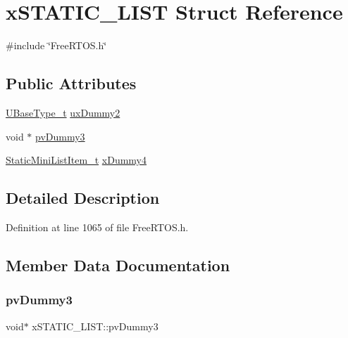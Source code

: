 \hypertarget{structxSTATIC__LIST}{}\section{x\+S\+T\+A\+T\+I\+C\+\_\+\+L\+I\+ST Struct Reference}
\label{structxSTATIC__LIST}


{\ttfamily \#include \char`\"{}Free\+R\+T\+O\+S.\+h\char`\"{}}

\subsection*{Public Attributes}
\begin{DoxyCompactItemize}
\item 
\hyperlink{pic32mx_2portmacro_8h_a646f89d4298e4f5afd522202b11cb2e6}{U\+Base\+Type\+\_\+t} \hyperlink{structxSTATIC__LIST_aa0522bc6ec8c956a9177ed9cb0e6d19f}{ux\+Dummy2}
\item 
void $\ast$ \hyperlink{structxSTATIC__LIST_aee46aef7379c7a341ec5a3e70d6dc85f}{pv\+Dummy3}
\item 
\hyperlink{FreeRTOS_8h_a9097f48f4dfa56e8e01d9179462c7994}{Static\+Mini\+List\+Item\+\_\+t} \hyperlink{structxSTATIC__LIST_aafa5f9d67d7f3636f2d1f8c372e75ecf}{x\+Dummy4}
\end{DoxyCompactItemize}


\subsection{Detailed Description}


Definition at line 1065 of file Free\+R\+T\+O\+S.\+h.



\subsection{Member Data Documentation}
\mbox{\label{structxSTATIC__LIST_aee46aef7379c7a341ec5a3e70d6dc85f}} 
\subsubsection{\texorpdfstring{pv\+Dummy3}{pvDummy3}}
{\footnotesize\ttfamily void$\ast$ x\+S\+T\+A\+T\+I\+C\+\_\+\+L\+I\+S\+T\+::pv\+Dummy3}



